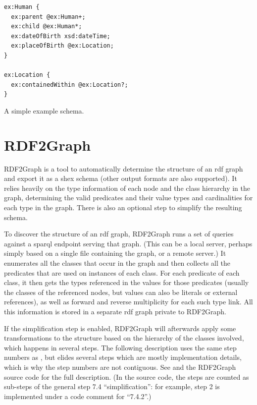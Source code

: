 \begin{lstfloat}
\begin{lstlisting}[language=sparql]
ex:Human {
  ex:parent @ex:Human+;
  ex:child @ex:Human*;
  ex:dateOfBirth xsd:dateTime;
  ex:placeOfBirth @ex:Location;
}

ex:Location {
  ex:containedWithin @ex:Location?;
}
\end{lstlisting}
\caption{A simple example schema.}
\label{listing:shex-example}
\end{lstfloat}


\section{RDF2Graph}
\label{sec:Background:RDF2Graph}


RDF2Graph %
\cite{vanDam2015}
is a tool to automatically determine the structure of an \gls{rdf} graph
and export it as a \gls{shex} schema
(other output formats are also supported).
It relies heavily on the type information of each node and the class hierarchy in the graph,
determining the valid predicates and their value types and cardinalities for each type in the graph.
There is also an optional step to simplify the resulting schema.

To discover the structure of an \gls{rdf} graph,
RDF2Graph runs a set of queries against a \gls{sparql} endpoint serving that graph.
(This can be a local server, perhaps simply based on a single file containing the graph,
or a remote server.)
It enumerates all the classes that occur in the graph
and then collects all the predicates that are used on instances of each class.
For each predicate of each class,
it then gets the types referenced in the values for those predicates
(usually the classes of the referenced nodes,
but values can also be literals or external references),
as well as forward and reverse multiplicity for each such type link.
All this information is stored in a separate \gls{rdf} graph private to RDF2Graph.

If the simplification step is enabled,
RDF2Graph will afterwards apply some transformations to the structure
based on the hierarchy of the classes involved,
which happens in several steps.
The following description uses the same step numbers as \cite{vanDam2015},
but elides several steps which are mostly implementation details,
which is why the step numbers are not contiguous.
See \cite{vanDam2015} and the RDF2Graph source code for the full description.
(In the source code, the steps are counted as sub-steps of the general step 7.4 “simplification”:
for example, step 2 is implemented under a code comment for “7.4.2”.)

